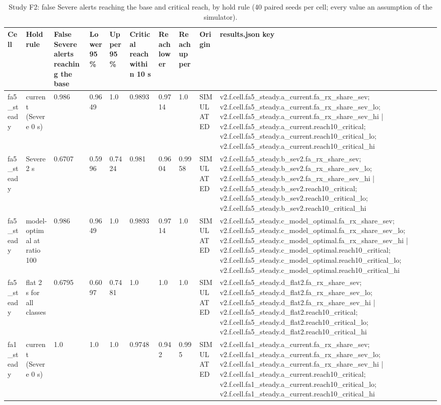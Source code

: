 \begin{table}[t]
\centering
\small
\caption{Study F2: false Severe alerts reaching the base and critical reach, by hold rule (40 paired seeds per cell; every value an assumption of the simulator).}
\label{tab:v2_tab_hold_sim}
\begin{tabular}{llllllllll}
\toprule
Cell & Hold rule & False Severe alerts reaching the base & Lower 95\% & Upper 95\% & Critical reach within 10 s & Reach lower & Reach upper & Origin & results.json key \\
\midrule
fa5\_steady & current (Severe 0 s) & 0.986 & 0.9649 & 1.0 & 0.9893 & 0.9714 & 1.0 & SIMULATED & v2.f.cell.fa5\_steady.a\_current.fa\_rx\_share\_sev; v2.f.cell.fa5\_steady.a\_current.fa\_rx\_share\_sev\_lo; v2.f.cell.fa5\_steady.a\_current.fa\_rx\_share\_sev\_hi | v2.f.cell.fa5\_steady.a\_current.reach10\_critical; v2.f.cell.fa5\_steady.a\_current.reach10\_critical\_lo; v2.f.cell.fa5\_steady.a\_current.reach10\_critical\_hi \\
fa5\_steady & Severe 2 s & 0.6707 & 0.5996 & 0.7424 & 0.981 & 0.9604 & 0.9958 & SIMULATED & v2.f.cell.fa5\_steady.b\_sev2.fa\_rx\_share\_sev; v2.f.cell.fa5\_steady.b\_sev2.fa\_rx\_share\_sev\_lo; v2.f.cell.fa5\_steady.b\_sev2.fa\_rx\_share\_sev\_hi | v2.f.cell.fa5\_steady.b\_sev2.reach10\_critical; v2.f.cell.fa5\_steady.b\_sev2.reach10\_critical\_lo; v2.f.cell.fa5\_steady.b\_sev2.reach10\_critical\_hi \\
fa5\_steady & model-optimal at ratio 100 & 0.986 & 0.9649 & 1.0 & 0.9893 & 0.9714 & 1.0 & SIMULATED & v2.f.cell.fa5\_steady.c\_model\_optimal.fa\_rx\_share\_sev; v2.f.cell.fa5\_steady.c\_model\_optimal.fa\_rx\_share\_sev\_lo; v2.f.cell.fa5\_steady.c\_model\_optimal.fa\_rx\_share\_sev\_hi | v2.f.cell.fa5\_steady.c\_model\_optimal.reach10\_critical; v2.f.cell.fa5\_steady.c\_model\_optimal.reach10\_critical\_lo; v2.f.cell.fa5\_steady.c\_model\_optimal.reach10\_critical\_hi \\
fa5\_steady & flat 2 s for all classes & 0.6795 & 0.6097 & 0.7481 & 1.0 & 1.0 & 1.0 & SIMULATED & v2.f.cell.fa5\_steady.d\_flat2.fa\_rx\_share\_sev; v2.f.cell.fa5\_steady.d\_flat2.fa\_rx\_share\_sev\_lo; v2.f.cell.fa5\_steady.d\_flat2.fa\_rx\_share\_sev\_hi | v2.f.cell.fa5\_steady.d\_flat2.reach10\_critical; v2.f.cell.fa5\_steady.d\_flat2.reach10\_critical\_lo; v2.f.cell.fa5\_steady.d\_flat2.reach10\_critical\_hi \\
fa1\_steady & current (Severe 0 s) & 1.0 & 1.0 & 1.0 & 0.9748 & 0.942 & 0.995 & SIMULATED & v2.f.cell.fa1\_steady.a\_current.fa\_rx\_share\_sev; v2.f.cell.fa1\_steady.a\_current.fa\_rx\_share\_sev\_lo; v2.f.cell.fa1\_steady.a\_current.fa\_rx\_share\_sev\_hi | v2.f.cell.fa1\_steady.a\_current.reach10\_critical; v2.f.cell.fa1\_steady.a\_current.reach10\_critical\_lo; v2.f.cell.fa1\_steady.a\_current.reach10\_critical\_hi \\

\end{tabular}
\end{table}
